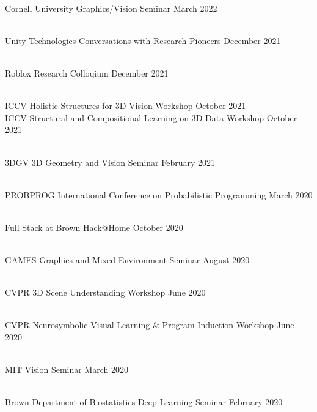 \documentclass[line,margin]{res}
\begin{document}
\begin{resume}
\\
\talk
	{Cornell University}
	{Graphics/Vision Seminar}
	{March 2022}

\\
\talk
	{Unity Technologies}
	{Conversations with Research Pioneers}
	{December 2021}

\\
\talk
	{Roblox}
	{Research Colloqium}
	{December 2021}

\\
\talk
	{ICCV}
	{Holistic Structures for 3D Vision Workshop}
	{October 2021}
\\
\talk
	{ICCV}
	{Structural and Compositional Learning on 3D Data Workshop}
	{October 2021}

\\
\talk
	{3DGV}
	{3D Geometry and Vision Seminar}
	{February 2021}

\\
\talk
	{PROBPROG}
	{International Conference on Probabilistic Programming}
	{March 2020}

\\
\talk
	{Full Stack at Brown}
	{Hack@Home}
	{October 2020}

\\
\talk
	{GAMES}
	{Graphics and Mixed Environment Seminar}
	{August 2020}

\\
\talk
	{CVPR}
	{3D Scene Understanding Workshop}
	{June 2020}

\\
\talk
	{CVPR}
	{Neurosymbolic Visual Learning \& Program Induction Workshop}
	{June 2020}

\\
\talk
	{MIT}
	{Vision Seminar}
	{March 2020}

\\
\talk
	{Brown Department of Biostatistics}
	{Deep Learning Seminar}
	{February 2020}


\end{resume}
\end{document}
